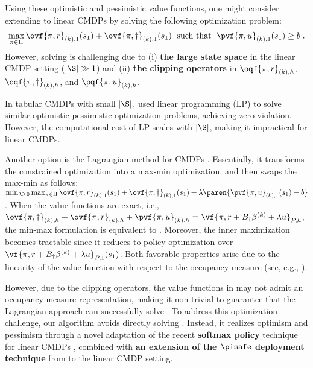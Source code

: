 Using these optimistic and pessimistic value functions, one might consider extending \optpes to linear CMDPs by solving the following optimization problem:
\begin{align}\label{eq:opt-pes-CMDP-informal}
\max_{\pi \in \Pi} \ovf{\pi, r}_{(k), 1}(s_1) + \ovf{\pi, \dagger}_{(k), 1}(s_1) 
\; \text{ such that }\; \pvf{\pi, u}_{(k), 1}(s_1) \geq b\;.
\end{align}
However, solving  is challenging due to (\(\mathrm{i}\)) \textbf{the large state space} in the linear CMDP setting (\(|\S| \gg 1\)) and (\(\mathrm{ii}\)) \textbf{the clipping operators} in \(\oqf{\pi, r}_{(k), h}\), \(\oqf{\pi, \dagger}_{(k), h}\), and \(\pqf{\pi, u}_{(k), h}\).

In tabular CMDPs with small $|\S|$, \citet{liu2021learning,bura2022dope} 
used linear programming (LP) to solve similar optimistic-pessimistic optimization problems, achieving zero violation. However, the computational cost of LP scales with $|\S|$, making it impractical for linear CMDPs.


Another option is the Lagrangian method for CMDPs \citep{altman1999constrained}.
Essentially, it transforms the constrained optimization into a max-min optimization, and then swaps the max-min as follows:
$
\min_{\lambda \geq 0} 
\max_{\pi \in \Pi} \ovf{\pi, r}_{(k), 1}(s_1) + \ovf{\pi, \dagger}_{(k), 1}(s_1)  
+ 
\lambda\paren{\pvf{\pi, u}_{(k), 1}(s_1) - b}
$.
When the value functions are exact, i.e., $\ovf{\pi, \dagger}_{(k), h}+ \ovf{\pi, r}_{(k), h} + \pvf{\pi, u}_{(k), h} = \vf{\pi, r+B_\dagger \beta^{(k)}+\lambda u}_{P, h}$, 
the min-max formulation is equivalent to  \citep{altman1999constrained}.
Moreover, the inner maximization becomes tractable since it reduces to policy optimization over 
$\vf{\pi, r +B_\dagger \beta^{(k)} + \lambda u}_{P, 1}(s_1)$.
Both favorable properties arise due to the linearity of the value function with respect to the occupancy measure (see, e.g., \citet{paternain2019constrained}).

However, due to the clipping operators, the value functions in  may not admit an occupancy measure representation, making it non-trivial to guarantee that the Lagrangian approach can successfully solve .
To address this optimization challenge, our algorithm avoids directly solving . 
Instead, it realizes optimism and pessimism through a novel adaptation of the recent \textbf{softmax policy} technique for linear CMDPs \citep{ghosh2024towards,ghosh2022provably}, combined with \textbf{an extension of the $\boldsymbol{\pisafe}$ deployment technique} from  to the linear CMDP setting.

